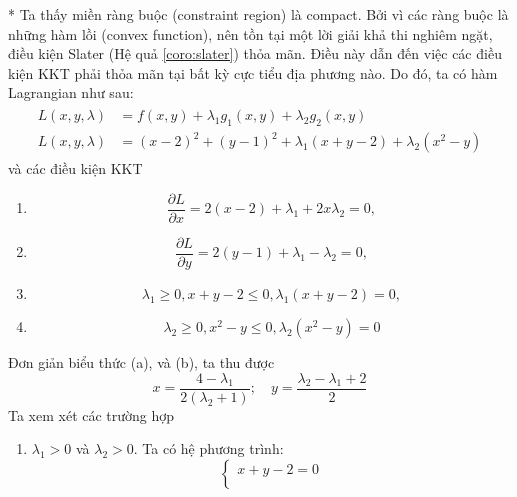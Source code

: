 \begin{solution}{*}
    Ta thấy miền ràng buộc (constraint region) là compact. Bởi vì các ràng buộc là những hàm lồi (convex function), nên tồn tại một lời giải khả thi nghiêm ngặt, điều kiện Slater (Hệ quả \ref{coro:slater}) thỏa mãn. Điều này dẫn đến việc các điều kiện KKT phải thỏa mãn tại bất kỳ cực tiểu địa phương nào. Do đó, ta có hàm Lagrangian như sau:
    \begin{align}
        \begin{aligned}
            L(x, y, \lambda) &= f(x, y) + \lambda_1g_1(x,y) + \lambda_2g_2(x,y)\\
            L(x, y, \lambda) &= (x-2)^2 + (y-1)^2 + \lambda_1(x + y - 2) + \lambda_2(x^2 - y)
        \end{aligned}
    \end{align}
    và các điều kiện KKT 
    \begin{enumerate}[label=(\alph*)]
        \item \begin{equation}
            \frac{\partial L}{\partial x} = 2(x - 2) + \lambda_1 + 2x\lambda_2 = 0,
        \end{equation}
        \item \begin{equation}
            \frac{\partial L}{\partial y} = 2(y-1) + \lambda_1 - \lambda_2 = 0,
        \end{equation}
        \item \begin{equation}
            \lambda_1 \geq 0, x + y - 2 \leq 0, \lambda_1(x + y - 2) = 0,
        \end{equation}
        \item \begin{equation}
            \lambda_2 \geq 0, x^2 - y \leq 0, \lambda_2(x^2 - y) = 0
        \end{equation}
    \end{enumerate}
    Đơn giản biểu thức (a), và (b), ta thu được
    \begin{equation}
        x = \dfrac{4-\lambda_1}{2(\lambda_2 + 1)};\quad y = \dfrac{\lambda_2 - \lambda_1 + 2}{2}
    \end{equation}
    Ta xem xét các trường hợp
    \begin{enumerate}[label=(\roman*)]
        \item $\lambda_1 > 0$ và $\lambda_2 > 0$. Ta có hệ phương trình:
        \begin{equation}
            \begin{cases}
                x + y - 2 = 0\\

\end{cases}
\end{equation}
\end{enumerate}
\end{solution}
